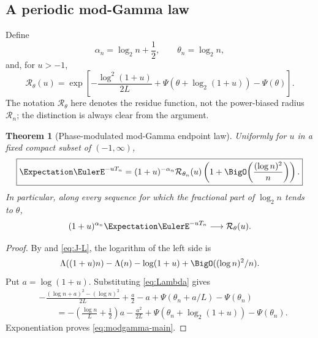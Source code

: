 \documentclass[11pt,oneside]{article}
\newtheorem{theorem}{Theorem}[section]
\theoremstyle{definition}
\theoremstyle{remark}
\begin{document}
\subsection{A periodic mod-Gamma law}

Define
\begin{equation}
 \alpha_n=\log_2n+\frac12,
 \qquad \theta_n=\log_2n,                           \label{eq:alpha-theta}
\end{equation}
and, for $u>-1$,
\begin{equation}
 \mathcal R_\theta(u)
 =\exp\!\left[
   -\frac{\log^2(1+u)}{2L}
   +\Psi\!\left(\theta+\log_2(1+u)\right)-\Psi(\theta)
  \right].                                         \label{eq:modgamma-residue}
\end{equation}
The notation $\mathcal R_\theta$ here denotes the residue function, not the
power-biased radius $\mathcal R_n$; the distinction is always clear from the
argument.

\begin{theorem}[Phase-modulated mod-Gamma endpoint law]
\label{thm:mod-gamma}
Uniformly for $u$ in a fixed compact subset of $(-1,\infty)$,
\begin{equation}
 \boxed{
 \Expectation\EulerE^{-uT_n}
 =(1+u)^{-\alpha_n}\mathcal R_{\theta_n}(u)
  \left(1+\BigO\!\left(\frac{(\log n)^2}{n}\right)\right).}    \label{eq:modgamma-main}
\end{equation}
In particular, along every sequence for which the fractional part of
$\log_2n$ tends to $\theta$,
\begin{equation}
 (1+u)^{\alpha_n}\Expectation\EulerE^{-uT_n}
 \longrightarrow\mathcal R_\theta(u).              \label{eq:modgamma-subsequence}
\end{equation}
\end{theorem}

\begin{proof}
By  and \eqref{eq:J-L}, the logarithm of the left side
is
\[
 \Lambda((1+u)n)-\Lambda(n)-\log(1+u)
 +\BigO((\log n)^2/n).
\]
Put $a=\log(1+u)$.  Substituting \eqref{eq:Lambda} gives
\begin{align*}
 &-\frac{(\log n+a)^2-(\log n)^2}{2L}
   +\frac a2-a
   +\Psi(\theta_n+a/L)-\Psi(\theta_n)\\
 &\qquad
 =-\left(\frac{\log n}{L}+\frac12\right)a
   -\frac{a^2}{2L}
   +\Psi(\theta_n+\log_2(1+u))-\Psi(\theta_n).
\end{align*}
Exponentiation proves \eqref{eq:modgamma-main}.
\end{proof}
\end{document}
